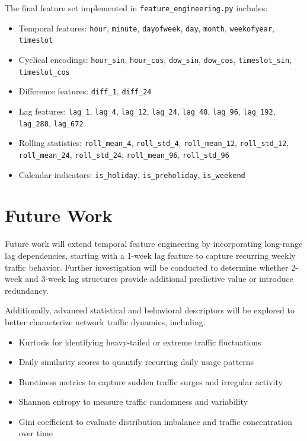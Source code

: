 \documentclass[conference]{IEEEtran}
\begin{document}
The final feature set implemented in \texttt{feature\_engineering.py} includes:
\begin{itemize}
    \item Temporal features: \texttt{hour}, \texttt{minute}, \texttt{dayofweek}, \texttt{day}, \texttt{month}, \texttt{weekofyear}, \texttt{timeslot}
    \item Cyclical encodings: \texttt{hour\_sin}, \texttt{hour\_cos}, \texttt{dow\_sin}, \texttt{dow\_cos}, \texttt{timeslot\_sin}, \texttt{timeslot\_cos}
    \item Difference features: \texttt{diff\_1}, \texttt{diff\_24}
    \item Lag features: \texttt{lag\_1}, \texttt{lag\_4}, \texttt{lag\_12}, \texttt{lag\_24}, \texttt{lag\_48}, \texttt{lag\_96}, \texttt{lag\_192}, \texttt{lag\_288}, \texttt{lag\_672}
    \item Rolling statistics: \texttt{roll\_mean\_4}, \texttt{roll\_std\_4}, \texttt{roll\_mean\_12}, \texttt{roll\_std\_12}, \texttt{roll\_mean\_24}, \texttt{roll\_std\_24}, \texttt{roll\_mean\_96}, \texttt{roll\_std\_96}
    \item Calendar indicators: \texttt{is\_holiday}, \texttt{is\_preholiday}, \texttt{is\_weekend}
\end{itemize}

\section{Future Work}

Future work will extend temporal feature engineering by incorporating long-range lag dependencies, starting with a 1-week lag feature to capture recurring weekly traffic behavior. Further investigation will be conducted to determine whether 2-week and 3-week lag structures provide additional predictive value or introduce redundancy.

Additionally, advanced statistical and behavioral descriptors will be explored to better characterize network traffic dynamics, including:

\begin{itemize}
    \item Kurtosis for identifying heavy-tailed or extreme traffic fluctuations
    \item Daily similarity scores to quantify recurring daily usage patterns
    \item Burstiness metrics to capture sudden traffic surges and irregular activity
    \item Shannon entropy to measure traffic randomness and variability
    \item Gini coefficient to evaluate distribution imbalance and traffic concentration over time
\end{itemize}
\end{document}
